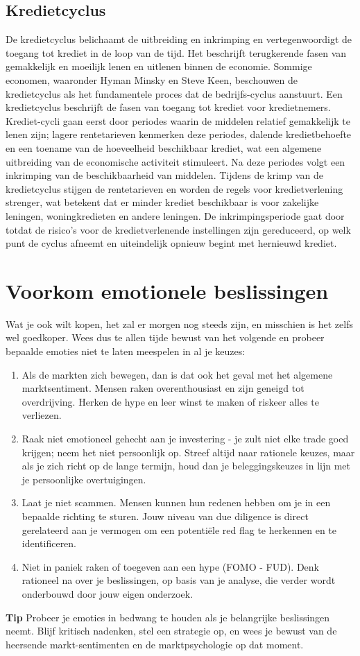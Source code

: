 \subsection{Kredietcyclus}
De kredietcyclus belichaamt de uitbreiding en inkrimping en vertegenwoordigt de toegang tot krediet in de loop van de tijd. Het beschrijft terugkerende fasen van gemakkelijk en moeilijk lenen en uitlenen binnen de economie. Sommige economen, waaronder Hyman Minsky en Steve Keen, beschouwen de kredietcyclus als het fundamentele proces dat de bedrijfs-cyclus aanstuurt. Een kredietcyclus beschrijft de fasen van toegang tot krediet voor kredietnemers. Krediet-cycli gaan eerst door periodes waarin de middelen relatief gemakkelijk te lenen zijn; lagere rentetarieven kenmerken deze periodes, dalende kredietbehoefte en een toename van de hoeveelheid beschikbaar krediet, wat een algemene uitbreiding van de economische activiteit stimuleert. Na deze periodes volgt een inkrimping van de beschikbaarheid van middelen. Tijdens de krimp van de kredietcyclus stijgen de rentetarieven en worden de regels voor kredietverlening strenger, wat betekent dat er minder krediet beschikbaar is voor zakelijke leningen, woningkredieten en andere leningen. De inkrimpingsperiode gaat door totdat de risico's voor de kredietverlenende instellingen zijn gereduceerd, op welk punt de cyclus afneemt en uiteindelijk opnieuw begint met hernieuwd krediet.

\section{Voorkom emotionele beslissingen}
Wat je ook wilt kopen, het zal er morgen nog steeds zijn, en misschien is het zelfs wel goedkoper. Wees dus te allen tijde bewust van het volgende en probeer bepaalde emoties niet te laten meespelen in al je keuzes:

\begin{enumerate}
    \item Als de markten zich bewegen, dan is dat ook het geval met het algemene marktsentiment. Mensen raken overenthousiast en zijn geneigd tot overdrijving. Herken de hype en leer winst te maken of riskeer alles te verliezen.
    \item Raak niet emotioneel gehecht aan je investering - je zult niet elke trade goed krijgen; neem het niet persoonlijk op. Streef altijd naar rationele keuzes, maar als je zich richt op de lange termijn, houd dan je beleggingskeuzes in lijn met je persoonlijke overtuigingen.
    \item Laat je niet scammen. Mensen kunnen hun redenen hebben om je in een bepaalde richting te sturen. Jouw niveau van due diligence is direct gerelateerd aan je vermogen om een potenti\"ele red flag te herkennen en te identificeren.
    \item Niet in paniek raken of toegeven aan een hype (FOMO - FUD). Denk rationeel na over je beslissingen, op basis van je analyse, die verder wordt onderbouwd door jouw eigen onderzoek.
\end{enumerate}

\begin{tipbox}{\textbf{Tip}}
 Probeer je emoties in bedwang te houden als je belangrijke beslissingen neemt. Blijf kritisch nadenken, stel een strategie op, en wees je bewust van de heersende markt-sentimenten en de marktpsychologie op dat moment.
\end{tipbox}